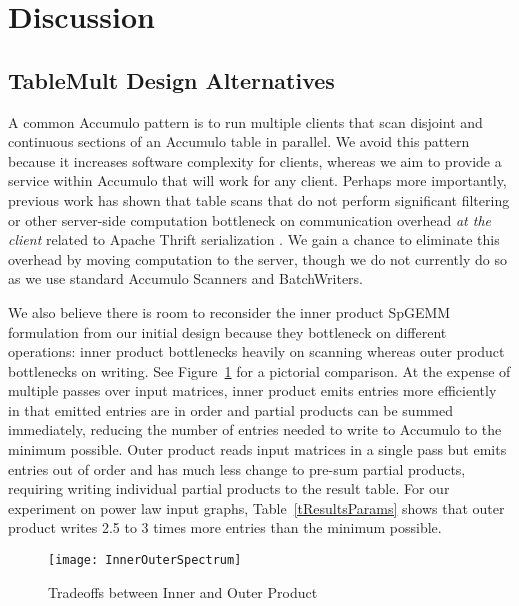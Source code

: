 
\section{Discussion}
\label{sDiscussion}

\subsection{TableMult Design Alternatives}

A common Accumulo pattern is to run multiple clients that scan disjoint and continuous sections 
of an Accumulo table in parallel.
We avoid this pattern because it increases software complexity for clients,
whereas we aim to provide a service within Accumulo that will work for any client.
Perhaps more importantly, previous work has shown that table scans 
that do not perform significant filtering or other server-side computation 
bottleneck on communication overhead \emph{at the client} related to Apache Thrift serialization \cite{sawyer2013understanding}.
We gain a chance to eliminate this overhead by moving computation to the server,
though we do not currently do so as we use standard Accumulo Scanners and BatchWriters.

We also believe there is room to reconsider the inner product SpGEMM formulation from our initial design
because they bottleneck on different operations: 
inner product bottlenecks heavily on scanning whereas outer product bottlenecks on writing.
See Figure~\ref{fInnerOuterSpectrum} for a pictorial comparison.
At the expense of multiple passes over input matrices, inner product emits entries more efficiently
in that emitted entries are in order and partial products can be summed immediately, 
reducing the number of entries needed to write to Accumulo to the minimum possible.
Outer product reads input matrices in a single pass
but emits %
entries out of order and 
has much less change to pre-sum partial products, 
requiring writing individual partial products to the result table.
For our experiment on power law input graphs, Table~\ref{tResultsParams} shows that outer product 
writes 2.5 to 3 times more entries than the minimum possible.

\begin{figure}[tbh]
\centering
\texttt{[image: InnerOuterSpectrum]}
\caption{Tradeoffs between Inner and Outer Product}
\label{fInnerOuterSpectrum}
\end{figure}

